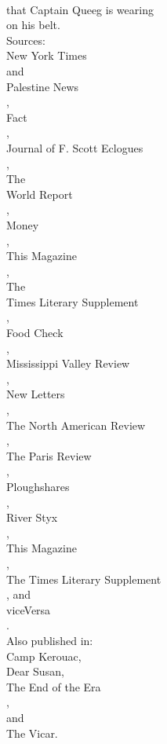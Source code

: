 \documentclass[smalldemyvopaper,11pt,twoside,onecolumn,openright,extrafontsizes]{memoir}
\begin{document}
\\that Captain Queeg is wearing
\\on his belt.
\\Sources:
\\New York Times
\\and
\\Palestine News
\\,
\\Fact
\\,
\\Journal of F. Scott Eclogues
\\,
\\The
\\World Report
\\,
\\Money
\\,
\\This Magazine
\\,
\\The
\\Times Literary Supplement
\\,
\\Food Check
\\,
\\Mississippi Valley Review
\\,
\\New Letters
\\,
\\The North American Review
\\,
\\The Paris Review
\\,
\\Ploughshares
\\,
\\River Styx
\\,
\\This Magazine
\\,
\\The Times Literary Supplement
\\, and
\\viceVersa
\\.
\\Also published in:
\\Camp Kerouac,
\\Dear Susan,
\\The End of the Era
\\,
\\and
\\The Vicar.
\end{document}
